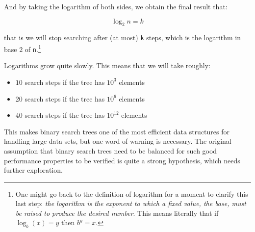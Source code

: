 And by taking the logarithm of both sides, we obtain the final result that:

$$\log_2 n = k$$

that is we will stop searching after (at most) \texttt{k} steps, which is the logarithm in base $2$ of \texttt{n}.\footnote{One might go back to the definition of logarithm for a moment to clarify this last step: \textit{the logarithm is the exponent to which a fixed value, the base, must be raised to produce the desired number}. This means literally that if $\log_b(x)=y$ then $b^y=x$.}

Logarithms grow quite slowly. This means that we will take roughly:
\begin{itemize}
\item $10$ search steps if the tree has $10^3$ elements
\item $20$ search steps if the tree has $10^6$ elements
\item $40$ search steps if the tree has $10^{12}$ elements
\end{itemize}

This makes binary search trees one of the most efficient data structures for handling large data sets, but one word of warning is necessary. The original assumption that binary search trees need to be balanced for such good performance properties to be verified is quite a strong hypothesis, which needs further exploration.
